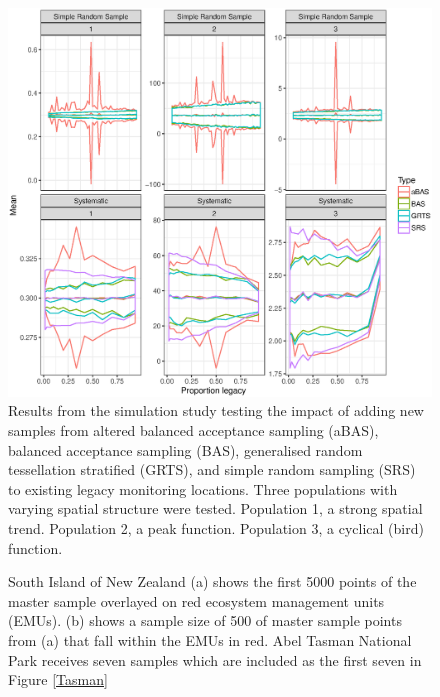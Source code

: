 \documentclass[titlepage]{article}
\begin{document}
\begin{figure}[H]
	\includegraphics[scale = 0.5]{Estimation.eps}
	\caption{Results from the simulation study testing the impact of adding new samples from altered balanced acceptance sampling (aBAS), balanced acceptance sampling (BAS), generalised random tessellation stratified (GRTS), and simple random sampling (SRS) to existing legacy monitoring locations. Three populations with varying spatial structure were tested. Population 1, a strong spatial trend. Population 2, a peak function. Population 3, a cyclical (bird) function.}
	\label{estimation}
\end{figure}

\newpage


\begin{figure}[H]
	\centering
	\hfill
	\caption{South Island of New Zealand (a) shows the first 5000 points of the master sample overlayed on red ecosystem management units (EMUs). (b) shows a sample size of 500 of master sample points from (a) that fall within the EMUs in red. Abel Tasman National Park receives seven samples which are included as the first seven in Figure \ref{Tasman}}
	\label{EMU}
\end{figure}

\newpage
\end{document}
